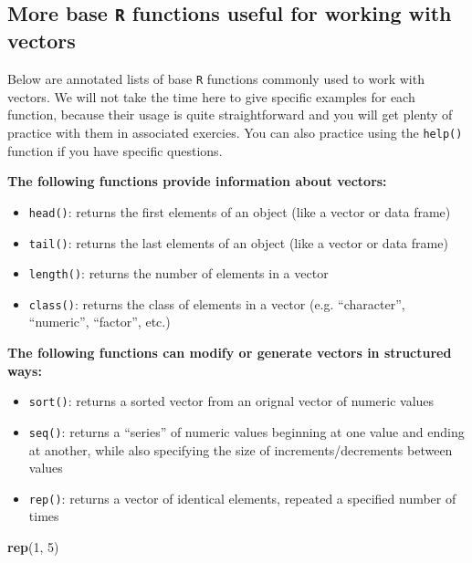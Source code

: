 \documentclass[]{book}
\newenvironment{Shaded}{\begin{snugshade}}{\end{snugshade}}
\newcommand{\DecValTok}[1]{\textcolor[rgb]{0.00,0.00,0.81}{#1}}
\newcommand{\KeywordTok}[1]{\textcolor[rgb]{0.13,0.29,0.53}{\textbf{#1}}}
\newcommand{\NormalTok}[1]{#1}
\begin{document}
\hypertarget{more-base-r-functions-useful-for-working-with-vectors}{%
\subsection{\texorpdfstring{More base \texttt{R} functions useful for working with vectors}{More base R functions useful for working with vectors}}\label{more-base-r-functions-useful-for-working-with-vectors}}

Below are annotated lists of base \texttt{R} functions commonly used to work with vectors. We will not take the time here to give specific examples for each function, because their usage is quite straightforward and you will get plenty of practice with them in associated exercies. You can also practice using the \texttt{help()} function if you have specific questions.

\textbf{The following functions provide information about vectors:}

\begin{itemize}
\item
  \texttt{head()}: returns the first elements of an object (like a vector or data frame)
\item
  \texttt{tail()}: returns the last elements of an object (like a vector or data frame)
\item
  \texttt{length()}: returns the number of elements in a vector
\item
  \texttt{class()}: returns the class of elements in a vector (e.g. ``character'', ``numeric'', ``factor'', etc.)
\end{itemize}

\textbf{The following functions can modify or generate vectors in structured ways:}

\begin{itemize}
\item
  \texttt{sort()}: returns a sorted vector from an orignal vector of numeric values
\item
  \texttt{seq()}: returns a ``series'' of numeric values beginning at one value and ending at another, while also specifying the size of increments/decrements between values
\item
  \texttt{rep()}: returns a vector of identical elements, repeated a specified number of times
\end{itemize}

\begin{Shaded}
\begin{Highlighting}[]
\KeywordTok{rep}\NormalTok{(}\DecValTok{1}\NormalTok{, }\DecValTok{5}\NormalTok{)}
\end{Highlighting}
\end{Shaded}
\end{document}
